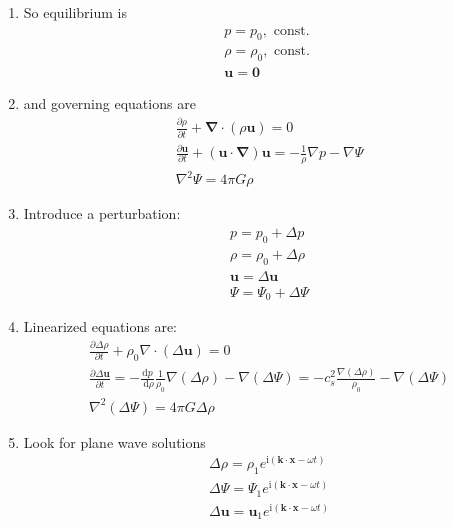 \documentclass[12pt,a4paper]{article}
\begin{document}
\begin{enumerate}
    \item So equilibrium is
    $$
    \begin{aligned}
    & p=p_0, \text { const. } \\
    & \rho=\rho_0, \text { const. } \\
    & \mathbf{u}=\mathbf{0}
    \end{aligned}
    $$
    \item and governing equations are
    $$
    \begin{aligned}
    & \frac{\partial \rho}{\partial t}+\boldsymbol{\nabla} \cdot(\rho \mathbf{u})=0 \\
    & \frac{\partial \mathbf{u}}{\partial t}+(\mathbf{u} \cdot \boldsymbol{\nabla}) \mathbf{u}=-\frac{1}{\rho} \nabla p-\nabla \Psi \\
    & \nabla^2 \Psi=4 \pi G \rho
    \end{aligned}
    $$
    \item Introduce a perturbation:
    $$
    \begin{aligned}
    & p=p_0+\Delta p \\
    & \rho=\rho_0+\Delta \rho \\
    & \mathbf{u}=\Delta \mathbf{u} \\
    & \Psi=\Psi_0+\Delta \Psi
    \end{aligned}
    $$
    \item Linearized equations are:
    $$
    \begin{aligned}
    & \frac{\partial \Delta \rho}{\partial t}+\rho_0 \nabla \cdot(\Delta \mathbf{u})=0 \\
    & \frac{\partial \Delta \mathbf{u}}{\partial t}=-\frac{\mathrm{d} p}{\mathrm{~d} \rho} \frac{1}{\rho_0} \nabla(\Delta \rho)-\nabla(\Delta \Psi)=-c_s^2 \frac{\nabla(\Delta \rho)}{\rho_0}-\nabla(\Delta \Psi) \\
    & \nabla^2(\Delta \Psi)=4 \pi G \Delta \rho
    \end{aligned}
    $$
    \item Look for plane wave solutions
    $$
    \begin{aligned}
    & \Delta \rho=\rho_1 e^{\mathrm{i}(\mathbf{k} \cdot \mathbf{x}-\omega t)} \\
    & \Delta \Psi=\Psi_1 e^{\mathrm{i}(\mathbf{k} \cdot \mathbf{x}-\omega t)} \\
    & \Delta \mathbf{u}=\mathbf{u}_1 e^{\mathrm{i}(\mathbf{k} \cdot \mathbf{x}-\omega t)}
    \end{aligned}
$$
\end{enumerate}
\end{document}
